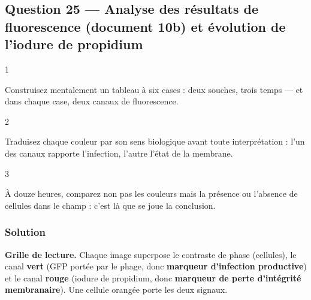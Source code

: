 \documentclass[11pt,a4paper]{article}
\begin{document}
\hypertarget{question-25-analyse-des-ruxe9sultats-de-fluorescence-document-10b-et-uxe9volution-de-liodure-de-propidium}{%
\subsection{Question 25 --- Analyse des résultats de fluorescence (document 10b) et évolution de l'iodure de propidium}\label{question-25-analyse-des-ruxe9sultats-de-fluorescence-document-10b-et-uxe9volution-de-liodure-de-propidium}}

\begin{indication}{1}

Construisez mentalement un tableau à six cases : deux souches, trois temps --- et dans chaque case, deux canaux de fluorescence.

\end{indication}

\begin{indication}{2}

Traduisez chaque couleur par son sens biologique avant toute interprétation : l'un des canaux rapporte l'infection, l'autre l'état de la membrane.

\end{indication}

\begin{indication}{3}

À douze heures, comparez non pas les couleurs mais la présence ou l'absence de cellules dans le champ : c'est là que se joue la conclusion.

\end{indication}

\hypertarget{solution-24}{%
\subsubsection{Solution}\label{solution-24}}

\textbf{Grille de lecture.} Chaque image superpose le contraste de phase (cellules), le canal \textbf{vert} (GFP portée par le phage, donc \textbf{marqueur d'infection productive}) et le canal \textbf{rouge} (iodure de propidium, donc \textbf{marqueur de perte d'intégrité membranaire}). Une cellule orangée porte les deux signaux.
\end{document}
